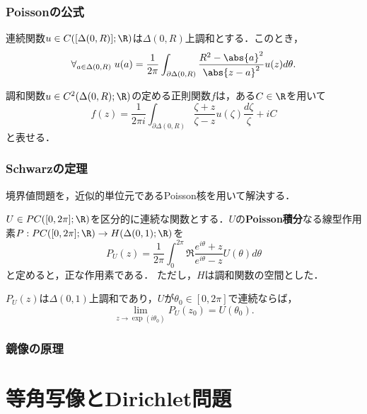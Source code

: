 \documentclass[uplatex, dvipdfmx]{jsreport}
\begin{document}
\subsection{Poissonの公式}

\begin{theorem}
    連続関数$u\in C([\Delta(0,R)];\R)$は$\Delta(0,R)$上調和とする．このとき，
    \[\forall_{a\in\Delta(0,R)}\;u(a)=\frac{1}{2\pi}\int_{\partial\Delta(0,R)}\frac{R^2-\abs{a}^2}{\abs{z-a}^2}u(z)d\theta.\]
\end{theorem}

\begin{corollary}
    調和関数$u\in C^2(\Delta(0,R);\R)$の定める正則関数$f$は，ある$C\in\R$を用いて
    \[f(z)=\frac{1}{2\pi i}\int_{\partial\Delta(0,R)}\frac{\zeta+z}{\zeta-z}u(\zeta)\frac{d\zeta}{\zeta}+iC\]
    と表せる．
\end{corollary}

\subsection{Schwarzの定理}

\begin{tcolorbox}[colframe=ForestGreen, colback=ForestGreen!10!white,breakable,colbacktitle=ForestGreen!40!white,coltitle=black,fonttitle=\bfseries\sffamily,
title=]
    境界値問題を，近似的単位元であるPoisson核を用いて解決する．
\end{tcolorbox}

\begin{definition}
    $U\in PC([0,2\pi];\R)$を区分的に連続な関数とする．$U$の\textbf{Poisson積分}なる線型作用素$P:PC([0,2\pi];\R)\to H(\Delta(0,1);\R)$を
    \[P_U(z)=\frac{1}{2\pi}\int^{2\pi}_0\Re\frac{e^{i\theta}+z}{e^{i\theta}-z}U(\theta)d\theta\]
    と定めると，正な作用素である．
    ただし，$H$は調和関数の空間とした．
\end{definition}

\begin{theorem}
    $P_U(z)$は$\Delta(0,1)$上調和であり，$U$が$\theta_0\in[0,2\pi]$で連続ならば，
    \[\lim_{z\to\exp(i\theta_0)}P_U(z_0)=U(\theta_0).\]
\end{theorem}

\subsection{鏡像の原理}

\chapter{等角写像とDirichlet問題}
\end{document}
